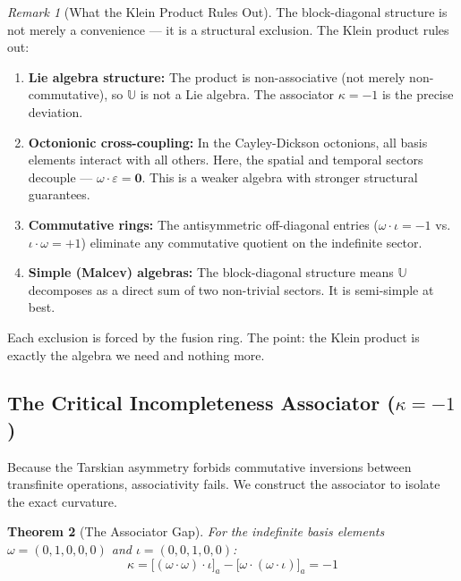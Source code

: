 \documentclass[12pt,oneside]{article}
\theoremstyle{principia}
\newtheorem{theorem}{Theorem}[section]
\theoremstyle{definition}
\theoremstyle{remark}
\newtheorem{remark}[theorem]{Remark}
\providecommand{\UU}{\mathbb{U}}
\providecommand{\eps}{\varepsilon}
\providecommand{\kap}{\kappa}
\begin{document}
\begin{remark}[What the Klein Product Rules Out]\label{rem:exclusion}
The block-diagonal structure is not merely a convenience --- it is a structural exclusion. The Klein product rules out:
\begin{enumerate}
\item \textbf{Lie algebra structure:} The product is non-associative (not merely non-commutative), so $\UU$ is not a Lie algebra. The associator $\kap = -1$ is the precise deviation.
\item \textbf{Octonionic cross-coupling:} In the Cayley-Dickson octonions, all basis elements interact with all others. Here, the spatial and temporal sectors decouple --- $\omega \cdot \eps = \mathbf{0}$. This is a weaker algebra with stronger structural guarantees.
\item \textbf{Commutative rings:} The antisymmetric off-diagonal entries ($\omega \cdot \iota = -1$ vs.\ $\iota \cdot \omega = +1$) eliminate any commutative quotient on the indefinite sector.
\item \textbf{Simple (Malcev) algebras:} The block-diagonal structure means $\UU$ decomposes as a direct sum of two non-trivial sectors. It is semi-simple at best.
\end{enumerate}
Each exclusion is forced by the fusion ring. The point: the Klein product is exactly the algebra we need and nothing more.
\end{remark}

\subsection{The Critical Incompleteness Associator ($\kap = -1$)}\label{sec:curvature}

Because the Tarskian asymmetry forbids commutative inversions between transfinite operations, associativity fails. We construct the associator to isolate the exact curvature.

\begin{theorem}[The Associator Gap]\label{thm:associator}\label{thm:curvature}
For the indefinite basis elements $\omega = (0,1,0,0,0)$ and $\iota = (0,0,1,0,0)$:
$$\kap = \bigl[(\omega \cdot \omega) \cdot \iota\bigr]_a - \bigl[\omega \cdot (\omega \cdot \iota)\bigr]_a = -1$$
\end{theorem}
\end{document}

